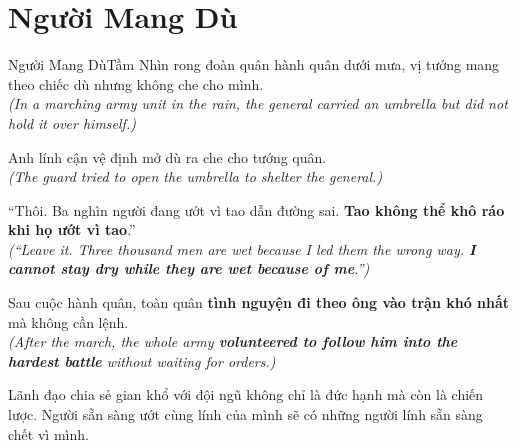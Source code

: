\section{Người Mang Dù}
\begin{truyen}{Người Mang Dù}{Tầm Nhìn}
rong đoàn quân hành quân dưới mưa, vị tướng mang theo chiếc dù nhưng không che cho mình.\\
\textit{(In a marching army unit in the rain, the general carried an umbrella but did not hold it over himself.)}

Anh lính cận vệ định mở dù ra che cho tướng quân.\\
\textit{(The guard tried to open the umbrella to shelter the general.)}

``Thôi. Ba nghìn người đang ướt vì tao dẫn đường sai. \textbf{Tao không thể khô ráo khi họ ướt vì tao}.''\\
\textit{(``Leave it. Three thousand men are wet because I led them the wrong way. \textbf{I cannot stay dry while they are wet because of me}.'')}

Sau cuộc hành quân, toàn quân \textbf{tình nguyện đi theo ông vào trận khó nhất} mà không cần lệnh.\\
\textit{(After the march, the whole army \textbf{volunteered to follow him into the hardest battle} without waiting for orders.)}
\end{truyen}
\begin{baihoc}
  Lãnh đạo chia sẻ gian khổ với đội ngũ không chỉ là đức hạnh mà còn là chiến lược. Người sẵn sàng ướt cùng lính của mình sẽ có những người lính sẵn sàng chết vì mình.
\end{baihoc}

